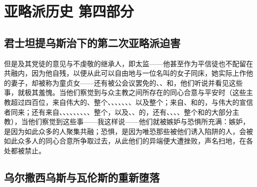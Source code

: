 
\section{亚略派历史 第四部分}

\par


\subsection{君士坦提乌斯治下的第二次亚略派迫害}

但是及其党徒的意见与不虔敬的继承人，即太监——他甚至作为平信徒也不配留在共融内，因为他自残，以便从此可以自由地与一位名叫的女子同床，她实际上作他的妻子，却被称为童贞女——还有被公会议罢免的、、和，他们听说并看见这些事，就极其羞愧。当他们察觉到与众主教之间所存在的同心合意与平安时（这些主教超过四百位，来自伟大的、整个、、、、、、、以及整个；来自、和的，与伟大的宣信者同来；还有来自、、、、、、、、、整个，以及、、的，还有、、、、整个和的大部分主教），当他们察觉到这些事——我这样说——他们就被嫉妒与恐惧所充满：嫉妒，是因为如此众多的人聚集共融；恐惧，是因为唯恐那些被他们诱入陷阱的人，会被如此众多人的同心合意所争取过去，从此他们的异端便大遭挫败，声名扫地，在各处都被禁止。\par


\subsection{乌尔撒西乌斯与瓦伦斯的重新堕落}


